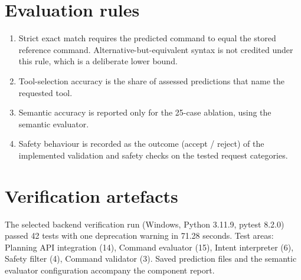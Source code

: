 \section{Evaluation rules}

\begin{enumerate}
  \item Strict exact match requires the predicted command to equal the stored
  reference command. Alternative-but-equivalent syntax is not credited under
  this rule, which is a deliberate lower bound.
  \item Tool-selection accuracy is the share of assessed predictions that name
  the requested tool.
  \item Semantic accuracy is reported only for the 25-case ablation, using the
  semantic evaluator.
  \item Safety behaviour is recorded as the outcome (accept / reject) of the
  implemented validation and safety checks on the tested request categories.
\end{enumerate}

\section{Verification artefacts}

The selected backend verification run (Windows, Python 3.11.9, pytest 8.2.0)
passed 42 tests with one deprecation warning in 71.28 seconds. Test areas:
Planning API integration (14), Command evaluator (15), Intent interpreter (6),
Safety filter (4), Command validator (3). Saved prediction files and the
semantic evaluator configuration accompany the component report.